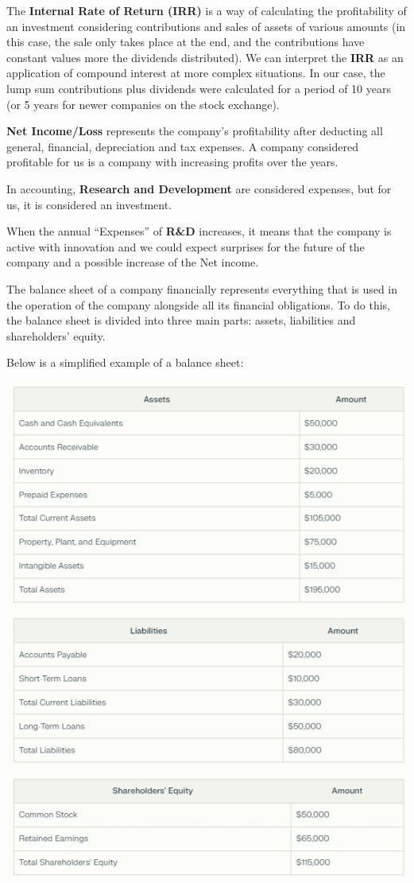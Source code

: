 \documentclass[
]{book}
\begin{document}
The \textbf{Internal Rate of Return (IRR)} is a way of calculating the profitability of an investment considering contributions and sales of assets of various amounts (in this case, the sale only takes place at the end, and the contributions have constant values more the dividends distributed). We can interpret the \textbf{IRR} as an application of compound interest at more complex situations. In our case, the lump sum contributions plus dividends were calculated for a period of 10 years (or 5 years for newer companies on the stock exchange).

\textbf{Net Income/Loss} represents the company's profitability after deducting all general, financial, depreciation and tax expenses. A company considered profitable for us is a company with increasing profits over the years.

In accounting, \textbf{Research and Development} are considered expenses, but for us, it is considered an investment.

When the annual ``Expenses'' of \textbf{R\&D} increases, it means that the company is active with innovation and we could expect surprises for the future of the company and a possible increase of the Net income.

The balance sheet of a company financially represents everything that is used in the operation of the company alongside all its financial obligations. To do this, the balance sheet is divided into three main parts: assets, liabilities and shareholders' equity.

Below is a simplified example of a balance sheet:

\includegraphics{BalanceSheet.jpg}
\end{document}
